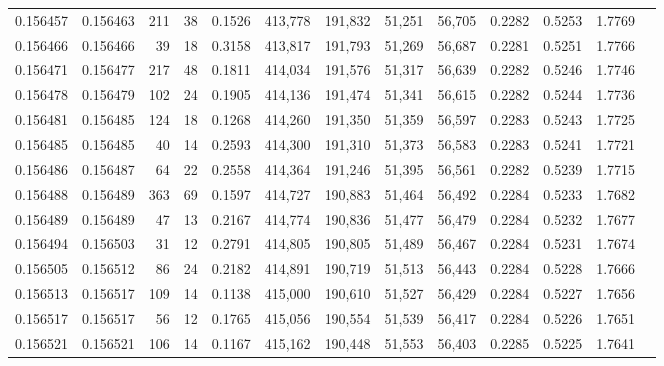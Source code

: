 \begin{tabular}{rrrrrrrrrrrrr}
0.156457 & 0.156463 &   211 &  38 &                                     0.1526 & 413,778 & 191,832 &  51,251 &  56,705 & 0.2282 & 0.5253 & 1.7769 \\
0.156466 & 0.156466 &    39 &  18 &                                     0.3158 & 413,817 & 191,793 &  51,269 &  56,687 & 0.2281 & 0.5251 & 1.7766 \\
0.156471 & 0.156477 &   217 &  48 &                                     0.1811 & 414,034 & 191,576 &  51,317 &  56,639 & 0.2282 & 0.5246 & 1.7746 \\
0.156478 & 0.156479 &   102 &  24 &                                     0.1905 & 414,136 & 191,474 &  51,341 &  56,615 & 0.2282 & 0.5244 & 1.7736 \\
0.156481 & 0.156485 &   124 &  18 &                                     0.1268 & 414,260 & 191,350 &  51,359 &  56,597 & 0.2283 & 0.5243 & 1.7725 \\
0.156485 & 0.156485 &    40 &  14 &                                     0.2593 & 414,300 & 191,310 &  51,373 &  56,583 & 0.2283 & 0.5241 & 1.7721 \\
0.156486 & 0.156487 &    64 &  22 &                                     0.2558 & 414,364 & 191,246 &  51,395 &  56,561 & 0.2282 & 0.5239 & 1.7715 \\
0.156488 & 0.156489 &   363 &  69 &                                     0.1597 & 414,727 & 190,883 &  51,464 &  56,492 & 0.2284 & 0.5233 & 1.7682 \\
0.156489 & 0.156489 &    47 &  13 &                                     0.2167 & 414,774 & 190,836 &  51,477 &  56,479 & 0.2284 & 0.5232 & 1.7677 \\
0.156494 & 0.156503 &    31 &  12 &                                     0.2791 & 414,805 & 190,805 &  51,489 &  56,467 & 0.2284 & 0.5231 & 1.7674 \\
0.156505 & 0.156512 &    86 &  24 &                                     0.2182 & 414,891 & 190,719 &  51,513 &  56,443 & 0.2284 & 0.5228 & 1.7666 \\
0.156513 & 0.156517 &   109 &  14 &                                     0.1138 & 415,000 & 190,610 &  51,527 &  56,429 & 0.2284 & 0.5227 & 1.7656 \\
0.156517 & 0.156517 &    56 &  12 &                                     0.1765 & 415,056 & 190,554 &  51,539 &  56,417 & 0.2284 & 0.5226 & 1.7651 \\
0.156521 & 0.156521 &   106 &  14 &                                     0.1167 & 415,162 & 190,448 &  51,553 &  56,403 & 0.2285 & 0.5225 & 1.7641 \\

\end{tabular}
